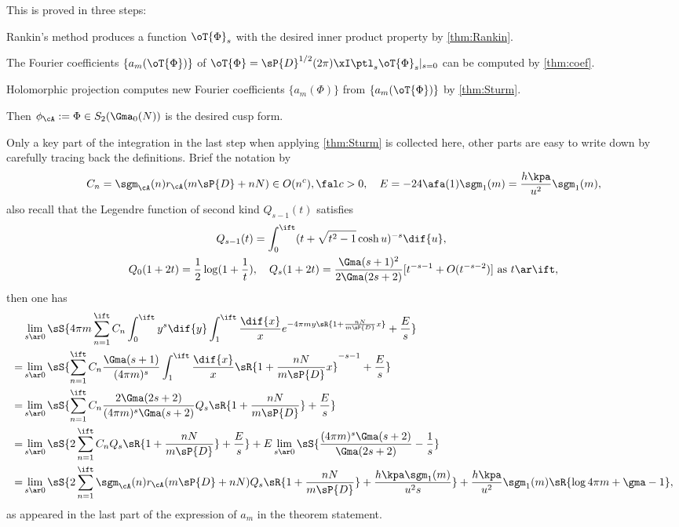 \documentclass[article, a4paper, twoside]{universal}
\begin{document}
\begin{prf}
	This is proved in three steps:
	\begin{enr}
		\item Rankin's method produces a function $\oT{\Phi}_{s}$ with the desired inner product property by \cref{thm:Rankin}.
		\item The Fourier coefficients $\{a_{m}(\oT{\Phi})\}$ of $\oT{\Phi}=\sP{D}^{1/2}(2\pi)\xI\ptl_{s}\oT{\Phi}_{s}|_{s=0}$ can be computed by \cref{thm:coef}.
		\item Holomorphic projection computes new Fourier coefficients $\{a_{m}(\Phi)\}$ from $\{a_{m}(\oT{\Phi})\}$ by \cref{thm:Sturm}.
	\end{enr}
	Then $\phi_{\cA}:=\Phi\in S_{2}(\Gma_{0}(N))$ is the desired cusp form.


	Only a key part of the integration in the last step when applying \cref{thm:Sturm} is collected here, other parts are easy to write down by carefully tracing back the definitions. Brief the notation by
	\[
		C_{n}=\sgm_{\cA}(n)r_{\cA}(m\sP{D}+nN)\in O(n^{c}),\fal c>0,\quad E=-24\afa(1)\sgm_{1}(m)=\frac{h\kpa}{u^{2}}\sgm_{1}(m),
	\]
	also recall that the Legendre function of second kind $Q_{s-1}(t)$ satisfies
	\begin{align*}
	  Q_{s-1}(t)&=\int_{0}^{\ift}(t+\sqrt{t^{2}-1}\cosh u)^{-s}\dif{u},\\
	  Q_{0}(1+2t)=\frac{1}{2}\log(1+\frac{1}{t})&, \quad Q_{s}(1+2t)=\frac{\Gma(s+1)^{2}}{2\Gma(2s+2)}[t^{-s-1}+O(t^{-s-2})]\text{ as $t\ar\ift$},
	\end{align*}
	then one has
	\begin{align*}
	  &\lim_{s\ar 0}\sS{4\pi m\sum_{n=1}^{\ift}C_{n}\int_{0}^{\ift}y^{s}\dif{y}\int_{1}^{\ift}\frac{\dif{x}}{x}e^{-4\pi my\sR{1+\frac{nN}{m\sP{D}}x}}+\frac{E}{s}} \\
	  =&\lim_{s\ar0}\sS{\sum_{n=1}^{\ift}C_{n}\frac{\Gma(s+1)}{(4\pi m)^{s}}\int_{1}^{\ift}\frac{\dif{x}}{x}\sR{1+\frac{nN}{m\sP{D}}x}^{-s-1}+\frac{E}{s}}\\
	  =&\lim_{s\ar 0}\sS{\sum_{n=1}^{\ift}C_{n}\frac{2\Gma(2s+2)}{(4\pi m)^{s}\Gma(s+2)}Q_{s}\sR{1+\frac{nN}{m\sP{D}}}+\frac{E}{s}} \\
	  =&\lim_{s\ar0}\sS{2\sum_{n=1}^{\ift}C_{n}Q_{s}\sR{1+\frac{nN}{m\sP{D}}}+\frac{E}{s}}+E\lim_{s\ar0}\sS{\frac{(4\pi m)^{s}\Gma(s+2)}{\Gma(2s+2)}-\frac{1}{s}}\\
	  =&\lim_{s\ar0}\sS{2\sum_{n=1}^{\ift}\sgm_{\cA}(n)r_{\cA}(m\sP{D}+nN)Q_{s}\sR{1+\frac{nN}{m\sP{D}}}+\frac{h\kpa\sgm_{1}(m)}{u^{2}s}}+\frac{h\kpa}{u^{2}}\sgm_{1}(m)\sR{\log{4\pi m}+\gma-1},\\
	\end{align*}
	as appeared in the last part of the expression of $a_{m}$ in the theorem statement.
\end{prf}
\end{document}
